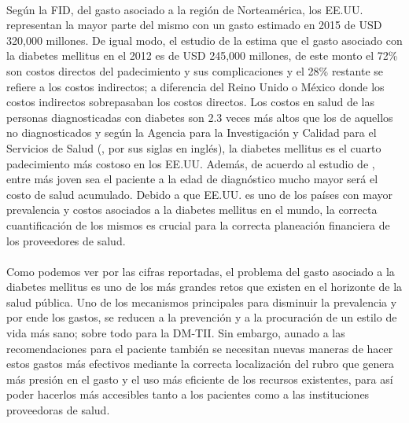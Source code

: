 \\   
Seg\'un la FID, del gasto asociado a la regi\'on de Norteam\'erica, los EE.UU. representan la mayor parte del mismo con un gasto estimado en 2015 de USD 320,000 millones. De igual modo, el estudio de la \cite{american2013economic} estima que el gasto asociado con la diabetes mellitus en el 2012 es de USD 245,000 millones, de este monto el 72\% son costos directos del padecimiento y sus complicaciones y el 28\% restante se refiere a los costos indirectos; a diferencia del Reino Unido o M\'exico donde los costos indirectos sobrepasaban los costos directos. Los costos en salud de las personas diagnosticadas con diabetes son 2.3 veces m\'as altos que los de aquellos no diagnosticados y seg\'un la Agencia para la Investigaci\'on y Calidad para el Servicios de Salud (\cite{MEPSSummary}, por sus siglas en ingl\'es), la diabetes mellitus es el cuarto padecimiento m\'as costoso en los EE.UU. Adem\'as, de acuerdo al estudio de \cite{zhuo2014lifetime}, entre m\'as joven sea el paciente a la edad de diagn\'ostico mucho mayor ser\'a el costo de salud acumulado. Debido a que EE.UU. es uno de los pa\'ises con mayor prevalencia y costos asociados a la diabetes mellitus en el mundo, la correcta cuantificaci\'on de los mismos es crucial para la correcta planeaci\'on financiera de los proveedores de salud.\\
\\
Como podemos ver por las cifras reportadas, el problema del gasto asociado a la diabetes mellitus es uno de los m\'as grandes retos que existen en el horizonte de la salud p\'ublica. Uno de los mecanismos principales para disminuir la prevalencia y por ende los gastos, se reducen a la prevenci\'on y a la procuraci\'on de un estilo de vida m\'as sano; sobre todo para la DM-TII. Sin embargo, aunado a las recomendaciones para el paciente tambi\'en se necesitan nuevas maneras de hacer estos gastos m\'as efectivos mediante la correcta localizaci\'on del rubro que genera m\'as presi\'on en el gasto y el uso m\'as eficiente de los recursos existentes, para as\'i poder hacerlos m\'as accesibles tanto a los pacientes como a las instituciones proveedoras de salud.\\
\\
